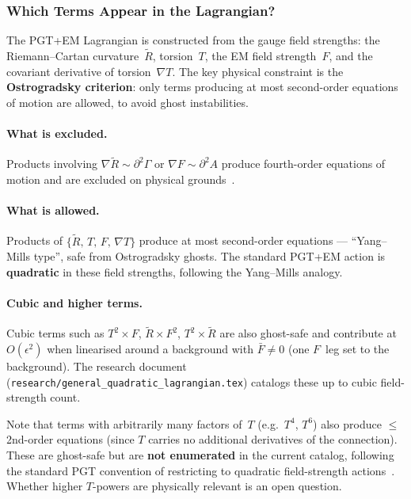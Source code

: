 \subsubsection{Which Terms Appear in the Lagrangian?}
\label{sec:bv-which-terms}

The PGT+EM Lagrangian is constructed from the gauge field strengths:
the Riemann--Cartan curvature~$\widetilde{R}$, torsion~$T$, the EM
field strength~$F$, and the covariant derivative of torsion~$\nabla T$.
The key physical constraint is the \textbf{Ostrogradsky criterion}:
only terms producing at most second-order equations of motion are
allowed, to avoid ghost instabilities.

\paragraph{What is excluded.}
Products involving $\nabla\widetilde{R} \sim \partial^2\Gamma$ or
$\nabla F \sim \partial^2 A$ produce fourth-order equations of motion
and are excluded on physical grounds~\cite{blagojevic2018ghost}.

\paragraph{What is allowed.}
Products of $\{\widetilde{R},\, T,\, F,\, \nabla T\}$ produce at most
second-order equations --- ``Yang--Mills type'', safe from Ostrogradsky
ghosts.  The standard PGT+EM action is \textbf{quadratic} in these
field strengths, following the Yang--Mills analogy.

\paragraph{Cubic and higher terms.}
Cubic terms such as $T^2 \times F$, $\widetilde{R} \times F^2$,
$T^2 \times \widetilde{R}$ are also ghost-safe and contribute at
$O(\epsilon^2)$ when linearised around a background with
$\bar{F} \neq 0$ (one $F$~leg set to the background).  The research
document (\texttt{research/general\_quadratic\_lagrangian.tex}) catalogs
these up to cubic field-strength count.

Note that terms with arbitrarily many factors of~$T$ (e.g.\ $T^4$,
$T^6$) also produce $\leq$2nd-order equations (since $T$ carries no
additional derivatives of the connection).  These are ghost-safe but are
\textbf{not enumerated} in the current catalog, following the standard
PGT convention of restricting to quadratic field-strength
actions~\cite{blagojevic2018ghost,shapiro2002torsion}.  Whether higher
$T$-powers are physically relevant is an open question.


